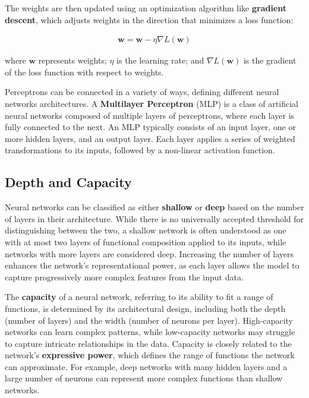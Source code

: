 The weights are then updated using an optimization algorithm like \textbf{gradient descent}, which adjusts weights in the direction that minimizes a loss function:

\begin{align}
  \mathbf{w} = \mathbf{w} - \eta \nabla L(\mathbf{w})  
\end{align}

where \(\mathbf{w}\) represents weights; \(\eta\) is the learning rate; and \(\nabla L(\mathbf{w})\) is the gradient of the loss function with respect to weights.

Perceptrons can be connected in a variety of ways, defining different neural networks architectures. A \textbf{Multilayer Perceptron} (MLP) is a class of artificial neural networks composed of multiple layers of perceptrons, where each layer is fully connected to the next. An MLP typically consists of an input layer, one or more hidden layers, and an output layer. Each layer applies a series of weighted transformations to its inputs, followed by a non-linear activation function.

\subsection{Depth and Capacity}


Neural networks can be classified as either \textbf{shallow} or \textbf{deep} based on the number of layers in their architecture. While there is no universally accepted threshold for distinguishing between the two, a shallow network is often understood as one with at most two layers of functional composition applied to its inputs, while networks with more layers are considered deep. Increasing the number of layers enhances the network's representational power, as each layer allows the model to capture progressively more complex features from the input data.

The \textbf{capacity} of a neural network, referring to its ability to fit a range of functions, is determined by its architectural design, including both the depth (number of layers) and the width (number of neurons per layer). High-capacity networks can learn complex patterns, while low-capacity networks may struggle to capture intricate relationships in the data. Capacity is closely related to the network's \textbf{expressive power}, which defines the range of functions the network can approximate. For example, deep networks with many hidden layers and a large number of neurons can represent more complex functions than shallow networks.

